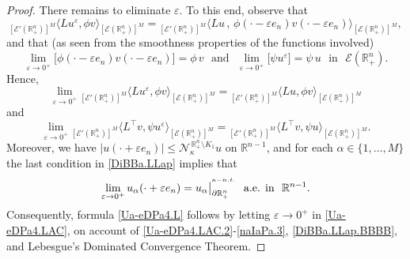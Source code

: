 \documentclass[10pt,a4paper]{amsart}
\begin{document}
\begin{proof}
There remains to eliminate $\varepsilon$. To this end, observe that 
%
\begin{equation}\label{Ua-eDPa4.LAC.2}
{}_{[{\mathcal{E}}'(\mathbb{R}^{n}_{+})]^M}\big\langle Lu^\varepsilon,\phi v
\big\rangle_{[{\mathcal{E}}(\mathbb{R}^{n}_{+})]^M}
={}_{[{\mathcal{E}}'(\mathbb{R}^{n}_{+})]^M}\big\langle 
Lu\,,\,\phi(\cdot-\varepsilon e_n)v(\cdot-\varepsilon e_n)
\big\rangle_{[{\mathcal{E}}(\mathbb{R}^{n}_{+})]^M},
\end{equation}
%
and that (as seen from the smoothness properties of the functions involved)
%
\begin{equation}\label{naIaPa.2}
\lim\limits_{\varepsilon\to 0^{+}}
\big[\phi(\cdot-\varepsilon e_n)v(\cdot-\varepsilon e_n)\big]=\phi\,v
\,\,\text{ and }\,\,\lim\limits_{\varepsilon\to 0^{+}}\big[\psi u^\varepsilon\big]
=\psi\,u\,\,\text{ in }\,\,{\mathcal{E}}(\mathbb{R}^{n}_{+}).
\end{equation}
%
Hence, 
%
\begin{equation}\label{naIaPa.2.iiia}
\lim\limits_{\varepsilon\to 0^{+}}
{}_{[{\mathcal{E}}'(\mathbb{R}^{n}_{+})]^M}\big\langle Lu^\varepsilon,\phi v
\big\rangle_{[{\mathcal{E}}(\mathbb{R}^{n}_{+})]^M}
={}_{[{\mathcal{E}}'(\mathbb{R}^{n}_{+})]^M}\big\langle Lu,\phi v
\big\rangle_{[{\mathcal{E}}(\mathbb{R}^{n}_{+})]^M}
\end{equation}
%
and
%
\begin{equation}\label{naIaPa.2.iiib}
\lim\limits_{\varepsilon\to 0^{+}}
{}_{[{\mathcal{E}}'(\mathbb{R}^{n}_{+})]^M}\big\langle L^{\top}v,
\psi u^\varepsilon\big\rangle_{[{\mathcal{E}}(\mathbb{R}^{n}_{+})]^M}
={}_{[{\mathcal{E}}'(\mathbb{R}^{n}_{+})]^M}\big\langle L^{\top}v,
\psi u\big\rangle_{[{\mathcal{E}}(\mathbb{R}^{n}_{+})]^M}.
\end{equation}
%
Moreover, we have $|u(\cdot+\varepsilon e_n)|\leq{\mathcal{N}}^{\,\mathbb{R}^{n}_{+}\setminus K_1}_\kappa u$ 
on $\mathbb{R}^{n-1}$, and for each $\alpha\in\{1,\dots,M\}$ the last condition in \eqref{DiBBa.LLap} implies that 
%
\begin{equation}\label{naIaPa.3}
\lim\limits_{\varepsilon\to 0^{+}}u_\alpha(\cdot+\varepsilon e_n)
=u_\alpha\big|_{\partial\mathbb{R}^{n}_{+}}^{{}^{\kappa-{\rm n.t.}}}
\,\,\text{ a.e. in }\,\,\mathbb{R}^{n-1}.
\end{equation}
%
Consequently, formula \eqref{Ua-eDPa4.L} follows by letting $\varepsilon\to 0^{+}$
in \eqref{Ua-eDPa4.LAC}, on account of \eqref{Ua-eDPa4.LAC.2}-\eqref{naIaPa.3}, 
\eqref{DiBBa.LLap.BBBB}, and Lebesgue's Dominated Convergence Theorem.
\end{proof}
\end{document}
